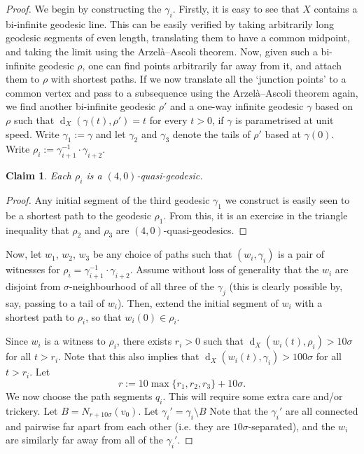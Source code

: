 \documentclass[11pt,a4paper]{amsart}
\DeclareMathOperator{\dist}{d}
\newtheorem{claim}[theorem]{Claim}
\theoremstyle{definition}
\begin{document}
\begin{proof}
    We begin by constructing the $\gamma_i$. Firstly, it is easy to see that $X$ contains a bi-infinite geodesic line. This can be easily verified by taking arbitrarily long geodesic segments of even length, translating them to have a common midpoint, and taking the limit using the Arzel\`a--Ascoli theorem. 
    Now, given such a bi-infinite geodesic $\rho$, one can find points arbitrarily far away from it, and attach them to $\rho$ with shortest paths. 
    If we now translate all the `junction points' to a common vertex and pass to a subsequence using the Arzel\`a--Ascoli theorem again, we find another bi-infinite geodesic $\rho'$ and a one-way infinite geodesic $\gamma$ based on $\rho$ such that $\dist_X(\gamma(t), \rho') = t$ for every $t > 0$, if $\gamma$ is parametrised at unit speed. 
    Write $\gamma_1 := \gamma$ and let $\gamma_2$ and $\gamma_3$ denote the tails of $\rho'$ based at $\gamma(0)$. Write $\rho_i := \gamma_{i+1}^{-1} \cdot \gamma_{i+2}$.

    \begin{claim}
        Each $\rho_i$ is a $(4,0)$-quasi-geodesic.
    \end{claim}

    \begin{proof}
        Any initial segment of the third geodesic $\gamma_1$ we construct is easily seen to be a shortest path to the geodesic $\rho_1$. From this, it is an exercise in the triangle inequality that $\rho_2$ and $\rho_3$ are $(4,0)$-quasi-geodesics. 
    \end{proof}


    Now, let $w_1$, $w_2$, $w_3$ be any choice of paths such that $(w_i, \gamma_i)$ is a pair of witnesses for $\rho_i = \gamma_{i+1}^{-1} \cdot \gamma_{i+2}$. Assume without loss of generality that the $w_i$ are disjoint from $\sigma$-neighbourhood of all three of the $\gamma_j$ (this is clearly possible by, say, passing to a tail of $w_i$). Then, extend the initial segment of $w_i$ with a shortest path to $\rho_i$, so that $w_i(0) \in \rho_i$. 

    Since $w_i$ is a witness to $\rho_i$, there exists $r_i > 0$ such that $\dist_X(w_i(t) , \rho_i) > 10\sigma$ for all $t > r_i$. Note that this also implies that $\dist_X(w_i(t), \gamma_i) > 100\sigma$ for all $t > r_i$. Let
    $$
    r := 10\max \{ r_1, r_2, r_3 \} + 10\sigma.
    $$
    We now choose the path segments $q_i$. This will require some extra care and/or trickery.
    Let $B = N_{r+10\sigma}(v_0)$. 
    Let $\gamma_i' = \gamma_i\setminus B$ Note that the $\gamma_i'$ are all connected and pairwise far apart from each other (i.e. they are $10\sigma$-separated), and the $w_i$ are similarly far away from all of the $\gamma_i'$. 
    

\end{proof}
\end{document}
